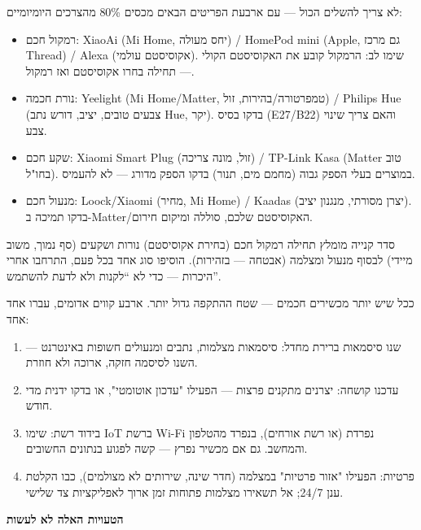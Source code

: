 
לא צריך להשלים הכול — עם ארבעת הפריטים הבאים מכסים 80\% מהצרכים היומיומיים:

\begin{itemize}
  \item רמקול חכם: XiaoAi (Mi Home, יחס מעולה) / HomePod mini (Apple, גם מרכז Thread) / Alexa (אקוסיסטם עולמי). שימו לב: הרמקול קובע את האקוסיסטם הקולי — תחילה בחרו אקוסיסטם ואז רמקול.
  \item נורת חכמה: Yeelight (Mi Home/Matter, טמפרטורה/בהירות, זול) / Philips Hue (צבעים טובים, יציב, דורש נתב Hue, יקר). בדקו בסיס (E27/B22) והאם צריך שינוי צבע.
  \item שקע חכם: Xiaomi Smart Plug (זול, מונה צריכה) / TP-Link Kasa (Matter טוב בחו"ל). במוצרים בעלי הספק גבוה (מחמם מים, תנור) בדקו הספק מדורג — לא להעמיס.
  \item מנעול חכם: Loock/Xiaomi (מחיר, Mi Home) / Kaadas (יצרן מסורתי, מנגנון יציב). בדקו תמיכה ב-Matter/האקוסיסטם שלכם, סוללה ומיקום חירום.
\end{itemize}

\begin{tcbinfo}{סדר קנייה מומלץ}
תחילה רמקול חכם (בחירת אקוסיסטם) נורות ושקעים (סף נמוך, משוב מיידי) לבסוף מנעול ומצלמה (אבטחה — בזהירות). הוסיפו סוג אחד בכל פעם, התרחבו אחרי היכרות — כדי לא “לקנות ולא לדעת להשתמש”.

\end{tcbinfo}


ככל שיש יותר מכשירים חכמים — שטח ההתקפה גדול יותר. ארבע קווים אדומים, עברו אחד אחד:

\begin{enumerate}
  \item שנו סיסמאות ברירת מחדל: סיסמאות מצלמות, נתבים ומנעולים חשופות באינטרנט — השנו לסיסמה חזקה, ארוכה ולא חוזרת.
  \item עדכנו קושחה: יצרנים מתקנים פרצות — הפעילו "עדכון אוטומטי", או בדקו ידנית מדי חודש.
  \item בידוד רשת: שימו IoT ברשת Wi-Fi נפרדת (או רשת אורחים), בנפרד מהטלפון והמחשב. גם אם מכשיר נפרץ — קשה לפגוע בנתונים החשובים.
  \item פרטיות: הפעילו "אזור פרטיות" במצלמה (חדר שינה, שירותים לא מצולמים), כבו הקלטת ענן 24/7; אל תשאירו מצלמות פתוחות זמן ארוך לאפליקציות צד שלישי.
\end{enumerate}

\textbf{הטעויות האלה לא לעשות}\par

